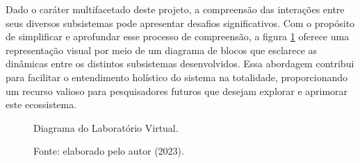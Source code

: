 Dado o caráter multifacetado deste projeto, a compreensão das interações entre seus diversos subsistemas pode apresentar desafios significativos. Com o propósito de simplificar e aprofundar esse processo de compreensão, a figura \ref{fig3:image_17} oferece uma representação visual por meio de um diagrama de blocos que esclarece as dinâmicas entre os distintos subsistemas desenvolvidos. Essa abordagem contribui para facilitar o entendimento holístico do sistema na totalidade, proporcionando um recurso valioso para pesquisadores futuros que desejam explorar e aprimorar este ecossistema.


\begin{figure}[!h]
	\centering
	\caption{Diagrama do Laboratório Virtual.}
	\caption*{Fonte: elaborado pelo autor (2023).}
	\label{fig3:image_17}
\end{figure}
